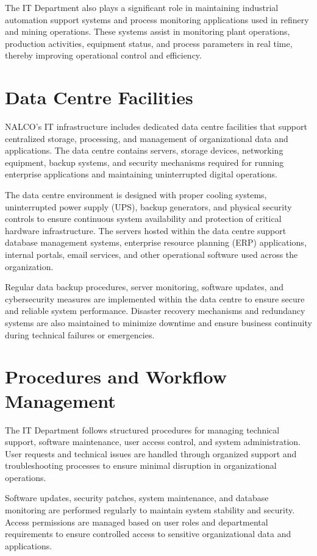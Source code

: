 The IT Department also plays a significant role in maintaining industrial automation support systems and process monitoring applications used in refinery and mining operations. These systems assist in monitoring plant operations, production activities, equipment status, and process parameters in real time, thereby improving operational control and efficiency.

\section{Data Centre Facilities}

NALCO’s IT infrastructure includes dedicated data centre facilities that support centralized storage, processing, and management of organizational data and applications. The data centre contains servers, storage devices, networking equipment, backup systems, and security mechanisms required for running enterprise applications and maintaining uninterrupted digital operations.

The data centre environment is designed with proper cooling systems, uninterrupted power supply (UPS), backup generators, and physical security controls to ensure continuous system availability and protection of critical hardware infrastructure. The servers hosted within the data centre support database management systems, enterprise resource planning (ERP) applications, internal portals, email services, and other operational software used across the organization.

Regular data backup procedures, server monitoring, software updates, and cybersecurity measures are implemented within the data centre to ensure secure and reliable system performance. Disaster recovery mechanisms and redundancy systems are also maintained to minimize downtime and ensure business continuity during technical failures or emergencies.

\section{Procedures and Workflow Management}

The IT Department follows structured procedures for managing technical support, software maintenance, user access control, and system administration. User requests and technical issues are handled through organized support and troubleshooting processes to ensure minimal disruption in organizational operations.

Software updates, security patches, system maintenance, and database monitoring are performed regularly to maintain system stability and security. Access permissions are managed based on user roles and departmental requirements to ensure controlled access to sensitive organizational data and applications.

